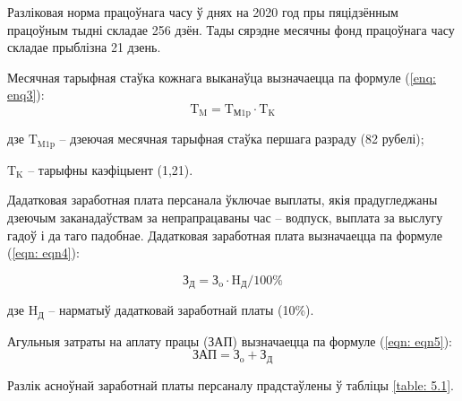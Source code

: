 Разліковая норма працоўнага часу ў днях на 2020 год пры пяцідзённым працоўным тыдні складае 256 дзён. Тады сярэдне месячны фонд працоўнага часу складае прыблізна 21 дзень.

Месячная тарыфная стаўка кожнага выканаўца вызначаецца па
формуле (\ref{enq: enq3}):
\begin{equation}
    \label{enq: enq3}
    \text{T}_\text{M} = \text{T}_\text{М1p} \cdot \text{T}_\text{K}
\end{equation}
\begin{Explanation}
    \item[дзе] $\text{T}_\text{M1p}$ -- дзеючая месячная тарыфная стаўка першага разраду (82 рубелі);
    \item $\text{T}_\text{K}$ -- тарыфны каэфіцыент (1,21).
\end{Explanation}

Дадатковая заработная плата персанала ўключае выплаты, якія
прадугледжаны дзеючым заканадаўствам за непрапрацаваны час --
водпуск, выплата за выслугу гадоў і да таго падобнае.
Дадатковая заработная плата вызначаецца па формуле (\ref{eqn: eqn4}):

\begin{equation}
    \label{eqn: eqn4}
    \text{З}_\text{Д} = \text{З}_\text{o} \cdot \text{H}_\text{Д} / 100\%
\end{equation}
\begin{Explanation}
    \item[дзе] $\text{H}_\text{Д}$ -- нарматыў дадатковай заработнай платы (10\%).
\end{Explanation}

Агульныя затраты на аплату працы (ЗАП) вызначаецца па формуле
(\ref{eqn: eqn5}):
\begin{equation}
    \label{eqn: eqn5}
    \text{ЗАП} = \text{З}_\text{o} + \text{З}_\text{Д}
\end{equation}

Разлік асноўнай заработнай платы персаналу прадстаўлены ў табліцы
\ref{table: 5.1}.

